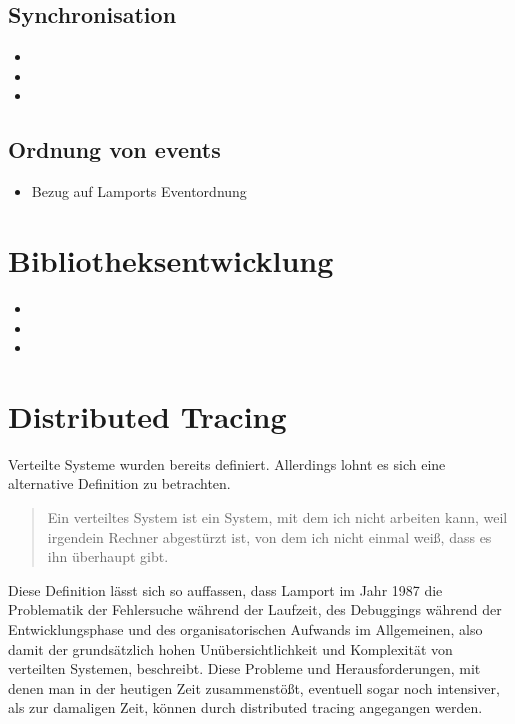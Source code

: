 \subsection{Synchronisation}
\begin{itemize}
	\item 
	\item 
	\item
\end{itemize}
\subsection{Ordnung von events}
\begin{itemize}
	\item Bezug auf Lamports Eventordnung
\end{itemize}
\section{Bibliotheksentwicklung}
\begin{itemize}
	\item 
	\item 
	\item
\end{itemize}

\section{Distributed Tracing}
Verteilte Systeme wurden bereits definiert. Allerdings lohnt es sich eine alternative Definition zu betrachten.

\begin{quote}
	Ein verteiltes System ist ein System, mit dem ich nicht arbeiten kann, weil irgendein Rechner abgestürzt ist, von dem ich nicht einmal weiß, dass es ihn überhaupt gibt.
\end{quote}


Diese Definition lässt sich so auffassen, dass Lamport im Jahr 1987 die Problematik der Fehlersuche während der Laufzeit, des Debuggings während der Entwicklungsphase und des organisatorischen Aufwands im Allgemeinen, also damit der grundsätzlich hohen Unübersichtlichkeit und Komplexität von verteilten Systemen, beschreibt. Diese Probleme und Herausforderungen, mit denen man in der heutigen Zeit zusammenstößt, eventuell sogar noch intensiver, als zur damaligen Zeit, können durch distributed tracing angegangen werden. 


